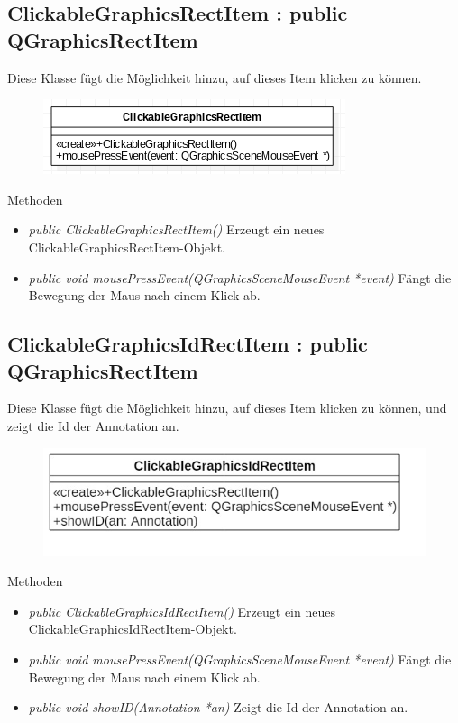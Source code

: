 \subsection*{ClickableGraphicsRectItem : public QGraphicsRectItem}
Diese Klasse fügt die Möglichkeit hinzu, auf dieses Item klicken zu können.

\begin{figure}[H]
	\centering
	\includegraphics[scale=0.5]{img/Klassendiagramm/Klassen/View/ClickableGraphicsRectItem}
	\label{fig:clickableGraphicsRectItem}
\end{figure}

Methoden
\begin{itemize}
	\item\textit{public ClickableGraphicsRectItem()}
	Erzeugt ein neues ClickableGraphicsRectItem-Objekt.
	\item\textit{public void mousePressEvent(QGraphicsSceneMouseEvent *event)}
	Fängt die Bewegung der Maus nach einem Klick ab.
\end{itemize}

\subsection*{ClickableGraphicsIdRectItem : public QGraphicsRectItem}
Diese Klasse fügt die Möglichkeit hinzu, auf dieses Item klicken zu können, und zeigt die Id der \gls{Annotation} an.

\begin{figure}[H]
	\centering
	\includegraphics[scale=0.5]{img/Klassendiagramm/Klassen/View/ClickableGraphicsIdRectItem}
	\label{fig:clickableGraphicsIdRectItem}
\end{figure}

Methoden
\begin{itemize}
	\item\textit{public ClickableGraphicsIdRectItem()}
	Erzeugt ein neues ClickableGraphicsIdRectItem-Objekt.
	\item\textit{public void mousePressEvent(QGraphicsSceneMouseEvent *event)}
	Fängt die Bewegung der Maus nach einem Klick ab.
	\item\textit{public void showID(Annotation *an)}
	Zeigt die Id der \gls{Annotation} an.
\end{itemize}

